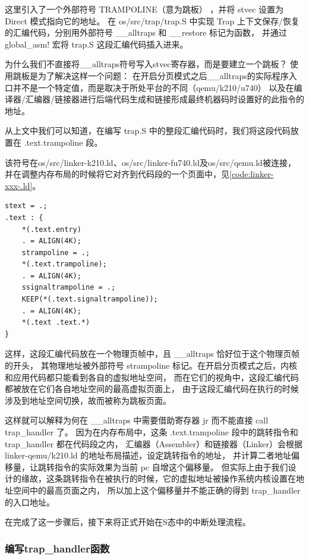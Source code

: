 这里引入了一个外部符号 TRAMPOLINE（意为跳板） ，并将 stvec 设置为 Direct 模式指向它的地址。
在 os/src/trap/trap.S 中实现 Trap 上下文保存/恢复的汇编代码，分别用外部符号 __alltraps 和 __restore 标记为函数，
并通过 global_asm! 宏将 trap.S 这段汇编代码插入进来。

为什么我们不直接将__alltraps符号写入stvec寄存器，而是要建立一个跳板？
使用跳板是为了解决这样一个问题：
在开启分页模式之后__alltraps的实际程序入口并不是一个特定值，而是取决于所处平台的不同（qemu/k210/u740）
以及在编译器/汇编器/链接器进行后端代码生成和链接形成最终机器码时设置好的此指令的地址。

从上文中我们可以知道，在编写 trap.S 中的整段汇编代码时，我们将这段代码放置在 .text.trampoline 段。

该符号在os/src/linker-k210.ld、os/src/linker-fu740.ld及os/src/qemu.ld被连接，
并在调整内存布局的时候将它对齐到代码段的一个页面中，见\autoref{code:linker-xxx-.ld}。

\begin{lstlisting}[label={code:linker-xxx-.ld},
    caption={linker-xxx-.ld}]
stext = .;
.text : {
    *(.text.entry)
    . = ALIGN(4K);
    strampoline = .;
    *(.text.trampoline);
    . = ALIGN(4K);
    ssignaltrampoline = .;
    KEEP(*(.text.signaltrampoline));
    . = ALIGN(4K);
    *(.text .text.*)
}
\end{lstlisting}

这样，这段汇编代码放在一个物理页帧中，且 __alltraps 恰好位于这个物理页帧的开头，
其物理地址被外部符号 strampoline 标记。在开启分页模式之后，内核和应用代码都只能看到各自的虚拟地址空间，
而在它们的视角中，这段汇编代码都被放在它们各自地址空间的最高虚拟页面上，
由于这段汇编代码在执行的时候涉及到地址空间切换，故而被称为跳板页面。

这样就可以解释为何在 __alltraps 中需要借助寄存器 jr 而不能直接 call trap_handler 了。
因为在内存布局中，这条 .text.trampoline 段中的跳转指令和 trap_handler 都在代码段之内，
汇编器（Assembler）和链接器（Linker）会根据 linker-qemu/k210.ld 的地址布局描述，设定跳转指令的地址，
并计算二者地址偏移量，让跳转指令的实际效果为当前 pc 自增这个偏移量。
但实际上由于我们设计的缘故，这条跳转指令在被执行的时候，它的虚拟地址被操作系统内核设置在地址空间中的最高页面之内，
所以加上这个偏移量并不能正确的得到 trap_handler 的入口地址。

在完成了这一步骤后，接下来将正式开始在S态中的中断处理流程。

\subsubsection{编写trap_handler函数}

